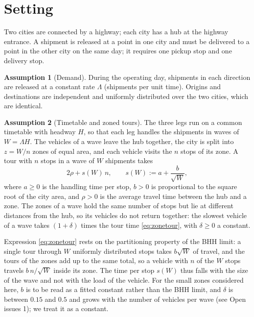 \documentclass[10pt, reqno]{amsart}
\theoremstyle{definition}
\newtheorem{assumption}{Assumption}
\begin{document}
\section{Setting}

Two cities are connected by a highway; each city has a hub at the highway entrance. A shipment is released at a point in one city and must be delivered to a point in the other city on the same day; it requires one pickup stop and one delivery stop.

\begin{assumption}[Demand]\label{as:demand}
During the operating day, shipments in each direction are released at a constant rate $\Lambda$ (shipments per unit time). Origins and destinations are independent and uniformly distributed over the two cities, which are identical.
\end{assumption}

\begin{assumption}[Timetable and zoned tours]\label{as:bhh}
The three legs run on a common timetable with headway $H$, so that each leg handles the shipments in waves of $W=\Lambda H$. The vehicles of a wave leave the hub together, the city is split into $z=W/n$ zones of equal area, and each vehicle visits the $n$ stops of its zone. A tour with $n$ stops in a wave of $W$ shipments takes
\begin{equation}\label{eq:zonetour}
2\rho+s(W)\,n,\qquad s(W):=a+\frac{b}{\sqrt W},
\end{equation}
where $a\ge0$ is the handling time per stop, $b>0$ is proportional to the square root of the city area, and $\rho>0$ is the average travel time between the hub and a zone. The zones of a wave hold the same number of stops but lie at different distances from the hub, so its vehicles do not return together: the slowest vehicle of a wave takes $(1+\delta)$ times the tour time \eqref{eq:zonetour}, with $\delta\ge0$ a constant.
\end{assumption}

Expression \eqref{eq:zonetour} rests on the partitioning property of the BHH limit: a single tour through $W$ uniformly distributed stops takes $b\sqrt W$ of travel, and the tours of the zones add up to the same total, so a vehicle with $n$ of the $W$ stops travels $b\,n/\sqrt W$ inside its zone. The time per stop $s(W)$ thus falls with the size of the wave and not with the load of the vehicle. For the small zones considered here, $b$ is to be read as a fitted constant rather than the BHH limit, and $\delta$ is between $0.15$ and $0.5$ and grows with the number of vehicles per wave (see Open issues 1); we treat it as a constant.
\end{document}
